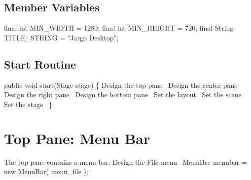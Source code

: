 \documentclass{article}
\def\nwendcode{\endtrivlist \endgroup}      %
\let\nwdocspar=\par
\begin{document}
\subsection{Member Variables}
\nwenddocs{}\endmoddef{}
final int MIN_WIDTH = 1280;
final int MIN_HEIGHT = 720;
final String TITLE_STRING = "Jargo Desktop";
\nwendcode{}\nwdocspar

\subsection{Start Routine}
\nwenddocs{}\endmoddef{}
public void start(Stage stage) \{
  \LA{}Design the top pane~{\nwtagstyle{}}\RA{}
  \LA{}Design the center pane~{\nwtagstyle{}}\RA{}
  \LA{}Design the right pane~{\nwtagstyle{}}\RA{}
  \LA{}Design the bottom pane~{\nwtagstyle{}}\RA{}
  \LA{}Set the layout~{\nwtagstyle{}}\RA{}
  \LA{}Set the scene~{\nwtagstyle{}}\RA{}
  \LA{}Set the stage~{\nwtagstyle{}}\RA{}
\}
\nwendcode{}\nwdocspar

\section{Top Pane: Menu Bar}
The top pane contains a menu bar.
\nwenddocs{}\endmoddef{}
\LA{}Design the File menu~{\nwtagstyle{}}\RA{}
MenuBar menubar = new MenuBar(
  menu_file
);
\nwendcode{}\nwdocspar
\end{document}

